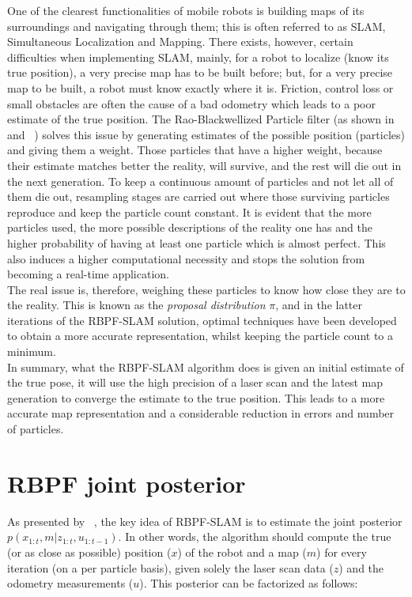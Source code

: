 \documentclass[letterpaper]{article}
\begin{document}
One of the clearest functionalities of mobile robots is building maps of its surroundings and navigating through them; this is often referred to as SLAM, Simultaneous Localization and Mapping. There exists, however, certain difficulties when implementing SLAM, mainly, for a robot to localize (know its true position), a very precise map has to be built before; but, for a very precise map to be built, a robot must know exactly where it is. Friction, control loss or small obstacles are often the cause of a bad odometry which leads to a poor estimate of the true position. The Rao-Blackwellized Particle filter (as shown in ~\cite{Doucet} and ~\cite{Murphy}) solves this issue by generating estimates of the possible position (particles) and giving them a weight. Those particles that have a higher weight, because their estimate matches better the reality, will survive, and the rest will die out in the next generation. To keep a continuous amount of particles and not let all of them die out, resampling stages are carried out where those surviving particles reproduce and keep the particle count constant. It is evident that the more particles used, the more possible descriptions of the reality one has and the higher probability of having at least one particle which is almost perfect. This also induces a higher computational necessity and stops the solution from becoming a real-time application.\\
The real issue is, therefore, weighing these particles to know how close they are to the reality. This is known as the \textit{proposal distribution} $\pi$, and in the latter iterations of the RBPF-SLAM solution, optimal techniques have been developed to obtain a more accurate representation, whilst keeping the particle count to a minimum.\\
In summary, what the RBPF-SLAM algorithm does is given an initial estimate of the true pose, it will use the high precision of a laser scan and the latest map generation to converge the estimate to the true position. This leads to a more accurate map representation and a considerable reduction in errors and number of particles.

\section{RBPF joint posterior}
As presented by ~\cite{Murphy}, the key idea of RBPF-SLAM is to estimate the joint posterior $p(x_{1:t},m|z_{1:t}, u_{1:t-1})$. In other words, the algorithm should compute the true (or as close as possible) position ($x$) of the robot and a map ($m$) for every iteration (on a per particle basis), given solely the laser scan data ($z$) and the odometry measurements ($u$). This posterior can be factorized as follows:
\end{document}
